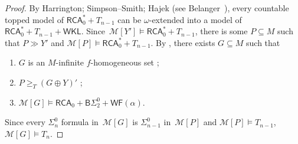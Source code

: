 \documentclass{article}
\numberwithin{theorem}{section}
\newtheorem{proposition}[theorem]{Proposition}
\newtheorem{corollary}[theorem]{Corollary}
\newcommand{\RCA}{\mathsf{RCA}}
\newcommand{\WKL}{\mathsf{WKL}}
\newcommand{\SEM}{\mathsf{SEM}}
\newcommand{\SADS}{\mathsf{SADS}}
\newcommand{\COH}{\mathsf{COH}}
\newcommand{\BSig}{\mathsf{B}\Sigma^0}
\newcommand{\ISig}{\mathsf{I}\Sigma^0}
\newcommand{\WF}{\mathsf{WF}}
\newcommand{\M}{\mathcal{M}}
\begin{document}
\begin{proof}
By Harrington; Simpson–Smith; Hajek (see Belanger~\cite{Blanger2022ConservationTF}), every countable topped model of $\RCA_0^* + T_{n-1}$ can be $\omega$-extended into a model of~$\RCA_0^* + T_{n-1} + \WKL$. Since~$\M[Y'] \models \RCA_0^* + T_{n-1}$, there is some $P \subseteq M$ such that $P \gg Y'$ and $\M[P] \models \RCA_0^* + T_{n-1}$. By , there exists $G \subseteq M$ such that 
\begin{enumerate}
    \item $G$ is an $M$-infinite $f$-homogeneous set ;
    \item $P \geq_T (G \oplus Y)'$ ;
    \item $\M[G] \models \RCA_0 + \BSig_2 + \WF(\alpha)$.
\end{enumerate}
Since every $\Sigma^0_n$ formula in~$\M[G]$ is $\Sigma^0_{n-1}$ in~$\M[P]$
and $\M[P] \models T_{n-1}$, $\M[G] \models T_n$.
\end{proof}


\end{document}
